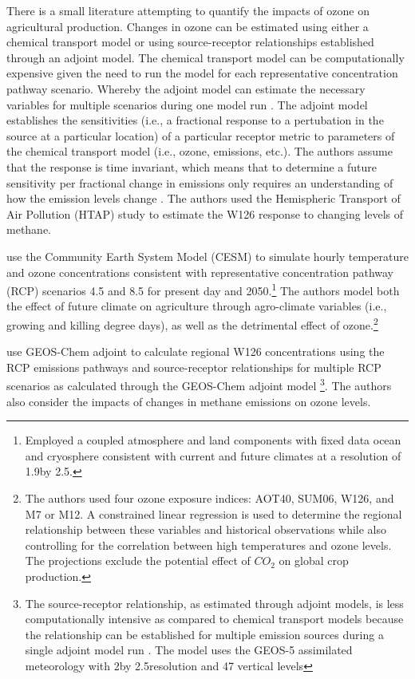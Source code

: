 \documentclass[10pt]{amsart}
\begin{document}
There is a small literature attempting to quantify the impacts of ozone on agricultural production. 
Changes in ozone can be estimated using either a chemical transport model or using source-receptor relationships established through an adjoint model. 
The chemical transport model can be computationally expensive given the need to run the model for each representative concentration pathway scenario.
Whereby the adjoint model can estimate the necessary variables for multiple scenarios during one model run \parencite{lapina:2015aa}.
The adjoint model establishes the sensitivities (i.e., a fractional response to a pertubation in the source at a particular location) of a particular receptor metric to parameters of the chemical transport model (i.e., ozone, emissions, etc.).
The authors assume that the response is time invariant, which means that to determine a future sensitivity per fractional change in emissions only requires an understanding of how the emission levels change \parencite{lapina:2015aa}.
The authors used the Hemispheric Transport of Air Pollution (HTAP) study to estimate the W126 response to changing levels of methane.

\cite{tai:2014aa} use the Community Earth System Model (CESM) to simulate hourly temperature and ozone concentrations consistent with representative concentration pathway (RCP) scenarios 4.5 and 8.5 for present day and 2050.\footnote{Employed a coupled atmosphere and land components with fixed data ocean and cryosphere consistent with current and future climates at a resolution of 1.9\degree by 2.5\degree.}
The authors model both the effect of future climate on agriculture through agro-climate variables (i.e., growing and killing degree days), as well as the detrimental effect of ozone.\footnote{The authors used four ozone exposure indices: AOT40, SUM06, W126, and M7 or M12. A constrained linear regression is used to determine the regional relationship between these variables and historical observations while also controlling for the correlation between high temperatures and ozone levels. The projections exclude the potential effect of $CO_2$ on global crop production.}  

\cite{lapina:2015aa} use GEOS-Chem adjoint to calculate regional W126 concentrations using the RCP emissions pathways and source-receptor relationships for multiple RCP scenarios as calculated through the GEOS-Chem adjoint model \footnote{The source-receptor relationship, as estimated through adjoint models, is less computationally intensive as compared to chemical transport models because the relationship can be established for multiple emission sources during a single adjoint model run \parencite{lapina:2015aa}. The model uses the GEOS-5 assimilated meteorology with 2\degree by 2.5\degree resolution and 47 vertical levels}.
The authors also consider the impacts of changes in methane emissions on ozone levels.
\end{document}
